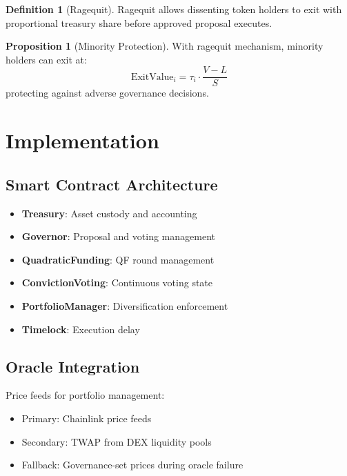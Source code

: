 \documentclass[11pt,a4paper]{article}
\theoremstyle{definition}
\newtheorem{definition}{Definition}[section]
\newtheorem{proposition}[theorem]{Proposition}
\theoremstyle{remark}
\begin{document}
\begin{definition}[Ragequit]
Ragequit allows dissenting token holders to exit with proportional treasury share before approved proposal executes.
\end{definition}

\begin{proposition}[Minority Protection]
With ragequit mechanism, minority holders can exit at:
\begin{equation}
    \text{ExitValue}_i = \tau_i \cdot \frac{V - L}{S}
\end{equation}
protecting against adverse governance decisions.
\end{proposition}

\section{Implementation}

\subsection{Smart Contract Architecture}

\begin{itemize}
    \item \textbf{Treasury}: Asset custody and accounting
    \item \textbf{Governor}: Proposal and voting management
    \item \textbf{QuadraticFunding}: QF round management
    \item \textbf{ConvictionVoting}: Continuous voting state
    \item \textbf{PortfolioManager}: Diversification enforcement
    \item \textbf{Timelock}: Execution delay
\end{itemize}

\subsection{Oracle Integration}

Price feeds for portfolio management:
\begin{itemize}
    \item Primary: Chainlink price feeds
    \item Secondary: TWAP from DEX liquidity pools
    \item Fallback: Governance-set prices during oracle failure
\end{itemize}
\end{document}
